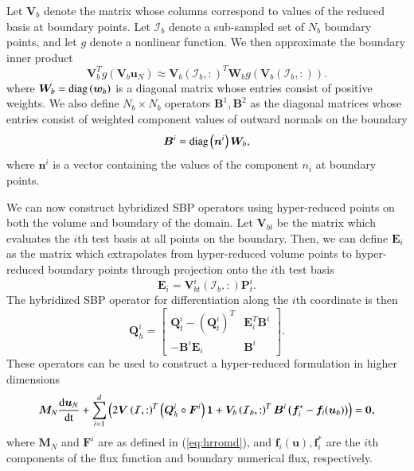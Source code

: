 \documentclass[preprint,10pt]{elsarticle}
\theoremstyle{definition}
\theoremstyle{lemma}
\theoremstyle{theorem}
\theoremstyle{assumption}
\newcommand{\td}[2]{\frac{{\rm d}#1}{{\rm d}{\rm #2}}}
\newcommand{\LRp}[1]{\left( #1 \right)}
\begin{document}
Let $\bm{V}_b$ denote the matrix whose columns correspond to values of the reduced basis at boundary points.  Let $\mathcal{I}_b$ denote a sub-sampled set of $N_b$ boundary points, and let $g$ denote a nonlinear function.  We then approximate the boundary inner product 
\[
\bm{V}_b^Tg(\bm{V}_b\bm{u}_N) \approx \bm{V}_b\LRp{\mathcal{I}_b,:}^T \bm{W}_b g\LRp{\bm{V}_b\LRp{\mathcal{I}_b,:}}.
\]
where $\bm{W}_b = {\rm diag}\LRp{\bm{w}_b}$ is a diagonal matrix whose entries consist of positive weights.  
We also define $N_b\times N_b$ operators $\bm{B}^1, \bm{B}^2$ as the diagonal matrices whose entries consist of weighted component values of outward normals on the boundary 
\[
\bm{B}^i = {\rm diag}\LRp{\bm{n}^i} \bm{W}_b,
\]
where $\bm{n}^i$ is a vector containing the values of the component $n_i$ at boundary points.  

We can now construct hybridized SBP operators using hyper-reduced points on both the volume and boundary of the domain.  Let $\bm{V}_{bt}$ be the matrix which evaluates the $i$th test basis at all points on the boundary.  Then, we can define $\bm{E}_i$ as the matrix which extrapolates from hyper-reduced volume points to hyper-reduced boundary points through projection onto the $i$th test basis
\[
\bm{E}_i = \bm{V}_{bt}^i\LRp{\mathcal{I}_b,:}\bm{P}^i_t.  
\]
The hybridized SBP operator for differentiation along the $i$th coordinate is then
\[
\bm{Q}_h^i = \begin{bmatrix}
\bm{Q}^i_t - \LRp{\bm{Q}^i_t}^T & \bm{E}_i^T\bm{B}^i \\ 
-\bm{B}^i\bm{E}_i & \bm{B}^i
\end{bmatrix}.
\]
These operators can be used to construct a hyper-reduced formulation in higher dimensions
\begin{gather}
\bm{M}_N\td{\bm{u}_N}{t} + \sum_{i=1}^d \LRp{2\bm{V}\LRp{\mathcal{I},:}^T\LRp{\bm{Q}^i_h \circ \bm{F}^i}\bm{1} + \bm{V}_b\LRp{\mathcal{I}_b,:}^T\bm{B}^i\LRp{\bm{f}_i^* - \bm{f}_i(\bm{u}_b)}} = \bm{0} \label{eq:hrromdbc},%
\end{gather}
where $\bm{M}_N$ and $\bm{F}^i$ are as defined in (\ref{eq:hrromd}), and $\bm{f}_i(\bm{u}), \bm{f}_i^*$ are the $i$th components of the flux function and boundary numerical flux, respectively.  
\end{document}
